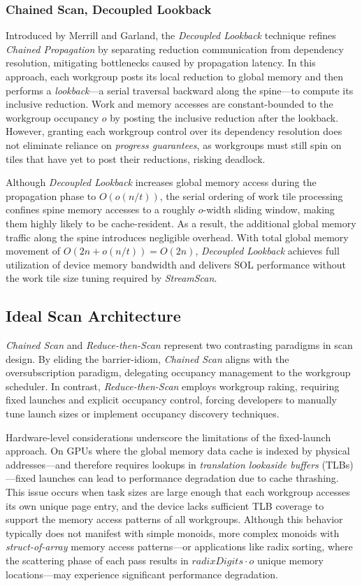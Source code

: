 \documentclass[acmsmall, manuscript, screen, review, anonymous]{acmart}
\begin{document}
\subsubsection{Chained Scan, Decoupled Lookback}
Introduced by Merrill and Garland, the \emph{Decoupled Lookback} technique refines \emph{Chained Propagation} by separating reduction communication from dependency resolution, mitigating bottlenecks caused by propagation latency. In this approach, each workgroup posts its local reduction to global memory and then performs a \emph{lookback}---a serial traversal backward along the spine---to compute its inclusive reduction. Work and memory accesses are constant-bounded to the workgroup occupancy $o$ by posting the inclusive reduction after the lookback. However, granting each workgroup control over its dependency resolution does not eliminate reliance on \emph{progress guarantees}, as workgroups must still spin on tiles that have yet to post their reductions, risking deadlock.

Although \emph{Decoupled Lookback} increases global memory access during the propagation phase to $O(o(n/t))$, the serial ordering of work tile processing confines spine memory accesses to a roughly $o$-width sliding window, making them highly likely to be cache-resident. As a result, the additional global memory traffic along the spine introduces negligible overhead. With total global memory movement of $O(2n+o(n/t))= O(2n)$, \emph{Decoupled Lookback} achieves full utilization of device memory bandwidth and delivers SOL performance without the work tile size tuning required by \emph{StreamScan}.

\subsection{Ideal Scan Architecture}
\emph{Chained Scan} and \emph{Reduce-then-Scan} represent two contrasting paradigms in scan design. By eliding the barrier-idiom, \emph{Chained Scan} aligns with the oversubscription paradigm, delegating occupancy management to the workgroup scheduler. In contrast, \emph{Reduce-then-Scan} employs workgroup raking, requiring fixed launches and explicit occupancy control, forcing developers to manually tune launch sizes or implement occupancy discovery techniques.

Hardware-level considerations underscore the limitations of the fixed-launch approach. On GPUs where the global memory data cache is indexed by physical addresses---and therefore requires lookups in \emph{translation lookaside buffers} (TLBs)---fixed launches can lead to performance degradation due to cache thrashing. This issue occurs when task sizes are large enough that each workgroup accesses its own unique page entry, and the device lacks sufficient TLB coverage to support the memory access patterns of all workgroups. Although this behavior typically does not manifest with simple monoids, more complex monoids with \emph{struct-of-array} memory access patterns---or applications like radix sorting, where the scattering phase of each pass results in $radixDigits \cdot o$ unique memory locations---may experience significant performance degradation.
\end{document}
